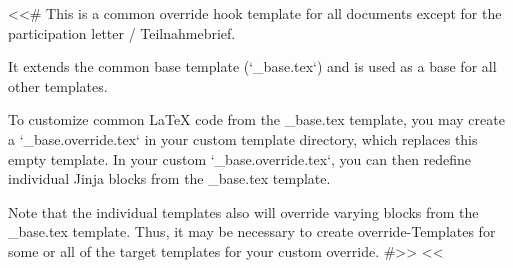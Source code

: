 <<# This is a common override hook template for all documents except for the participation letter / Teilnahmebrief.

    It extends the common base template (`_base.tex`) and is used as a base for all other templates.

    To customize common LaTeX code from the _base.tex template, you may create a `_base.override.tex` in your custom
    template directory, which replaces this empty template. In your custom `_base.override.tex`, you can then redefine
    individual Jinja blocks from the _base.tex template.

    Note that the individual templates also will override varying blocks from the _base.tex template. Thus, it may be
    necessary to create override-Templates for some or all of the target templates for your custom override.
#>>
<<%
